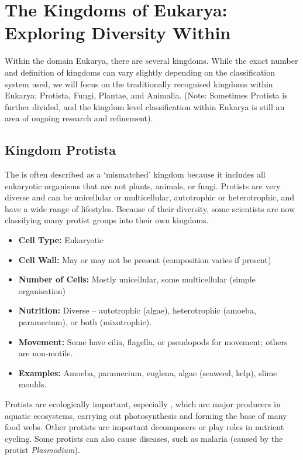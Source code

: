 \section{The Kingdoms of Eukarya: Exploring Diversity Within}

Within the domain Eukarya, there are several kingdoms.  While the exact number and definition of kingdoms can vary slightly depending on the classification system used, we will focus on the traditionally recognised kingdoms within Eukarya: Protista, Fungi, Plantae, and Animalia.  (Note: Sometimes Protista is further divided, and the kingdom level classification within Eukarya is still an area of ongoing research and refinement).

\subsection{Kingdom Protista}

The  is often described as a ‘mismatched’ kingdom because it includes all eukaryotic organisms that are not plants, animals, or fungi. Protists are very diverse and can be unicellular or multicellular, autotrophic or heterotrophic, and have a wide range of lifestyles.  Because of their diversity, some scientists are now classifying many protist groups into their own kingdoms.

\begin{itemize}
    \item \textbf{Cell Type:} Eukaryotic
    \item \textbf{Cell Wall:} May or may not be present (composition varies if present)
    \item \textbf{Number of Cells:} Mostly unicellular, some multicellular (simple organisation)
    \item \textbf{Nutrition:}  Diverse – autotrophic (algae), heterotrophic (amoeba, paramecium), or both (mixotrophic).
    \item \textbf{Movement:}  Some have cilia, flagella, or pseudopods for movement; others are non-motile.
    \item \textbf{Examples:} Amoeba, paramecium, euglena, algae (seaweed, kelp), slime moulds.
\end{itemize}

Protists are ecologically important, especially , which are major producers in aquatic ecosystems, carrying out photosynthesis and forming the base of many food webs.  Other protists are important decomposers or play roles in nutrient cycling. Some protists can also cause diseases, such as malaria (caused by the protist \textit{Plasmodium}).

